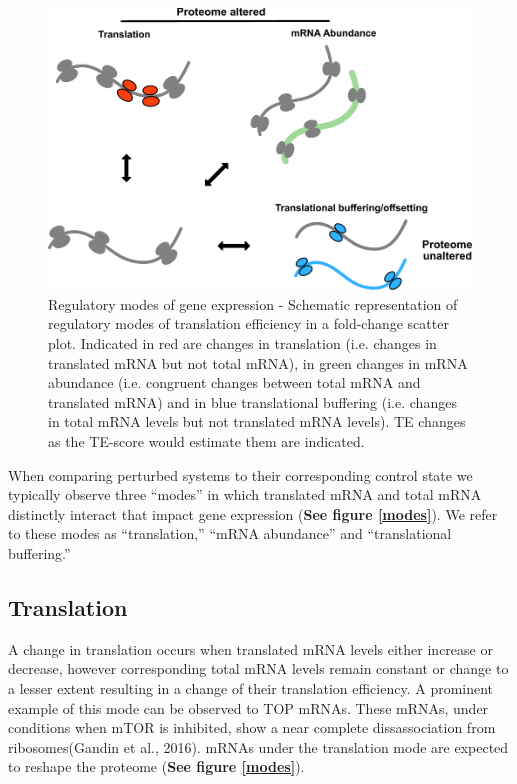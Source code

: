 \documentclass[
  12pt,
  openany]{book}
\begin{document}
\begin{figure}
  \includegraphics{./figures/geneModes_MRNA.pdf}
  \caption{Regulatory modes of gene expression - Schematic representation of regulatory modes of translation efficiency in a fold-change scatter plot. Indicated in red are changes in translation (i.e. changes in translated mRNA but not total mRNA), in green changes in mRNA abundance (i.e. congruent changes between total mRNA and translated mRNA) and in blue translational buffering (i.e. changes in total mRNA levels but not translated mRNA levels). TE changes as the TE-score would estimate them are indicated.\label{fig:modes}}
\end{figure}

When comparing perturbed systems to their corresponding control state we typically observe three ``modes'' in which translated mRNA and total mRNA distinctly interact that impact gene expression (\textbf{See figure \ref{modes}}). We refer to these modes as ``translation,'' ``mRNA abundance'' and ``translational buffering.''

\subsection{Translation}

A change in translation occurs when translated mRNA levels either increase or decrease, however corresponding total mRNA levels remain constant or change to a lesser extent resulting in a change of their translation efficiency. A prominent example of this mode can be observed to TOP mRNAs. These mRNAs, under conditions when mTOR is inhibited, show a near complete dissassociation from ribosomes(Gandin et al., 2016). mRNAs under the translation mode are expected to reshape the proteome (\textbf{See figure \ref{modes}}).
\end{document}

